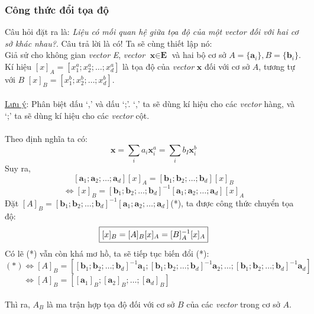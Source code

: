 \documentclass{article}
\begin{document}
\subsubsection*{Công thức đổi tọa độ}
Câu hỏi đặt ra là: \textit{Liệu có mối quan hệ giữa tọa độ của một vector đối với hai cơ sở khác nhau?}. Câu trả lời là có! Ta sẽ cùng thiết lập nó:\\
Giả sử cho không gian \textit{vector} \textit{E}, \textit{vector} $\textbf{x} \in \textbf{E}$ và hai bộ cơ sở $A = \{\textbf{a}_i\}, B = \{\textbf{b}_i\}$. Kí hiệu $[x]_A = [x_1^a; x_2^a; \ldots ;x_d^a]$ là tọa độ của \textit{vector} $\textbf{x}$ đối với cơ sở $A$, tương tự với $B$ $[x]_B = [x_1^b; x_2^b; \ldots; x_d^b]$.\\ \\
\underline{Lưu ý}: Phân biệt dấu `,' và dấu `;'. `,' ta sẽ dùng kí hiệu cho các \textit{vector} hàng, và `;' ta sẽ dùng kí hiệu cho các \textit{vector} cột.\\ \\%
Theo định nghĩa ta có: $$\textbf{x} = \sum_{i}{a_i}{\textbf{x}_i^a} = \sum_{i}{b_I}{\textbf{x}_i^b}$$
Suy ra, $$[\textbf{a}_1; \textbf{a}_2; \ldots; \textbf{a}_d][x]_{A} = [\textbf{b}_1; \textbf{b}_2; \ldots; \textbf{b}_d][x]_{B}$$
$$\iff [x]_{B} = [\textbf{b}_1; \textbf{b}_2; \ldots; \textbf{b}_d]^{-1}[\textbf{a}_1; \textbf{a}_2; \ldots; \textbf{a}_d][x]_{A}$$
Đặt $[A]_{B} = [\textbf{b}_1; \textbf{b}_2; \ldots; \textbf{b}_d]^{-1}[\textbf{a}_1; \textbf{a}_2; \ldots; \textbf{a}_d]$(*), ta được công thức chuyển tọa độ:
$$\fbox{$[x]_{B} = [A]_{B}[x]_{A} = [B]_{A}^{-1}[x]_A$}$$
Có lẽ (*) vẫn còn khá mơ hồ, ta sẽ tiếp tục biến đổi (*):
$$(*) \iff [A]_{B} =  \left[[\textbf{b}_1; \textbf{b}_2; \ldots; \textbf{b}_d]^{-1} \textbf{a}_1; [\textbf{b}_1; \textbf{b}_2; \ldots; \textbf{b}_d]^{-1} \textbf{a}_2; \ldots; [\textbf{b}_1; \textbf{b}_2; \ldots; \textbf{b}_d]^{-1} \textbf{a}_d \right]$$
$ \phantom{(*)} \iff [A]_{B} = [[\textbf{a}_1]_{B}; [\textbf{a}_2]_{B}; \ldots; [\textbf{a}_d]_{B}]$\\ \\
Thì ra, $A_B$ là ma trận hợp tọa độ đối với cơ sở $B$ của các \textit{vector} trong cơ sở $A$.

\end{document}
